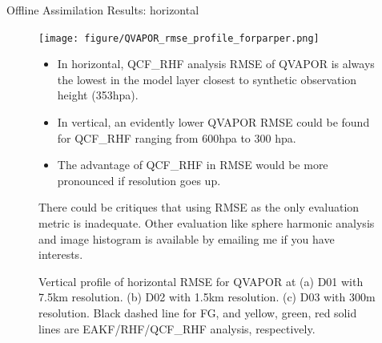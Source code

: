 \documentclass[final]{beamer}
\newlength{\colwidth}
\begin{document}
\begin{frame}[t]
\begin{columns}[t]
\begin{column}{\colwidth}
\begin{block}{Offline Assimilation Results: horizontal}
                \begin{figure}
                  \begin{minipage}[c]{0.45\textwidth}
                    \texttt{[image: figure/QVAPOR\_rmse\_profile\_forparper.png]}
                  \end{minipage}\hfill
                  \begin{minipage}[c]{0.55\textwidth}
                    \caption{Vertical profile of horizontal RMSE for QVAPOR at (a) D01 with 7.5km resolution. (b) D02 with 1.5km resolution. (c) D03 with 300m resolution. Black dashed line for FG, and yellow, green, red solid lines are EAKF/RHF/QCF\_RHF analysis, respectively. }\label{rmse_vert}
                    
                    \vspace{5cm}
                    
                    \begin{itemize}
                        \item In horizontal, QCF\_RHF analysis RMSE of QVAPOR is always the lowest in the model layer closest to synthetic observation height (353hpa).
                        \item In vertical, an evidently lower QVAPOR RMSE could be found for QCF\_RHF ranging from 600hpa to 300 hpa.
                        \item The advantage of QCF\_RHF in RMSE would be more pronounced if resolution goes up.
                    \end{itemize}  
                    
                    \vspace{2cm}
                    
                    There could be critiques that using RMSE as the only evaluation metric is inadequate. Other evaluation like sphere harmonic analysis and image histogram is available by emailing me if you have interests.
                  \end{minipage}\hfill
                \end{figure}
			\end{block}
			


\end{column}
\end{columns}
\end{frame}
\end{document}
